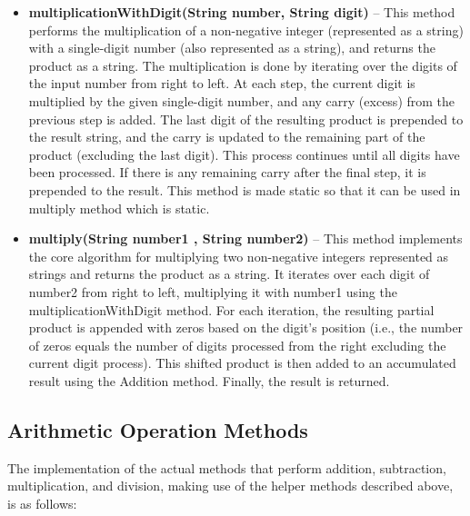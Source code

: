 \documentclass[a4paper,12pt]{article}
\begin{document}
{\begin{itemize}
    \item \textbf{multiplicationWithDigit(String number, String digit)} -- This method performs the multiplication of a non-negative integer (represented as a string) with a single-digit number (also represented as a string), and returns the product as a string. The multiplication is done by iterating over the digits of the input number from right to left. At each step, the current digit is multiplied by the given single-digit number, and any carry (excess) from the previous step is added. The last digit of the resulting product is prepended to the result string, and the carry is updated to the remaining part of the product (excluding the last digit). This process continues until all digits have been processed. If there is any remaining carry after the final step, it is prepended to the result. This method is made static so that it can be used in multiply method which is static.\\

    
    \item \textbf{multiply(String number1 , String number2)} -- This method implements the core algorithm for multiplying two non-negative integers represented as strings and returns the product as a string. It iterates over each digit of number2 from right to left, multiplying it with number1 using the multiplicationWithDigit method. For each iteration, the resulting partial product is appended with zeros based on the digit’s position (i.e., the number of zeros equals the number of digits processed from the right excluding the current digit process). This shifted product is then added to an accumulated result using the Addition method. Finally, the result is returned.\\
    
\end{itemize}

\subsection{Arithmetic Operation Methods}

The implementation of the actual methods that perform addition, subtraction, multiplication, and division, making use of the helper methods described above, is as follows:\\

}
\end{document}
